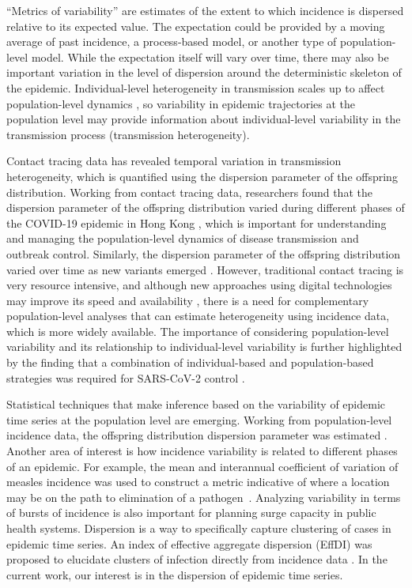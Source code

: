 \documentclass[10pt,letterpaper]{article}
\begin{document}
``Metrics of variability'' are estimates of the extent to which incidence is dispersed relative to its expected value.
The expectation could be provided by a moving average of past incidence, a process-based model, or another type of population-level model. 
While the expectation itself will vary over time, there may also be important variation in the level of dispersion around the deterministic skeleton of the epidemic. 
Individual-level heterogeneity in transmission scales up to affect population-level dynamics \cite{lloyd-smith_superspreading_2005}, so variability in epidemic trajectories at the population level may provide information about individual-level variability in the transmission process (transmission heterogeneity).

Contact tracing data has revealed temporal variation in transmission heterogeneity, which is quantified using the dispersion parameter of the offspring distribution.
Working from contact tracing data, researchers found that the dispersion parameter of the offspring distribution varied during different phases of the COVID-19 epidemic in Hong Kong \cite{guo2023statistical}, which is important for understanding and managing the population-level dynamics of disease transmission and outbreak control.
Similarly, the dispersion parameter of the offspring distribution varied over time as new variants emerged \cite{ko2023time}. 
However, traditional contact tracing is very resource intensive, and although new approaches using digital technologies may improve its speed and availability \cite{kretzschmar_impact_2020}, there is a need for complementary population-level analyses that can estimate heterogeneity using incidence data, which is more widely available. The importance of considering population-level variability and its relationship to individual-level variability is further highlighted by the finding that a combination of individual-based and population-based strategies was required for SARS-CoV-2 control \cite{sun_transmission_2021}. 

Statistical techniques that make inference based on the variability of epidemic time series at the population level are emerging. Working from population-level incidence data, the offspring distribution dispersion parameter was estimated \cite{kirkegaard_superspreading_2021}.
Another area of interest is how incidence variability is related to different phases of an epidemic. For example, the mean and interannual coefficient of variation of measles incidence was used to construct a metric indicative of where a location may be on the path to elimination of a pathogen~\cite{graham_measles_2019}. 
Analyzing variability in terms of bursts of incidence is also important for planning surge capacity in public health systems\cite{wallinga_metropolitan_2018}. 
Dispersion is a way to specifically capture clustering of cases in epidemic time series. An index of effective aggregate dispersion (EffDI) was proposed to elucidate clusters of infection directly from incidence data \cite{schneckenreither_assessing_2023}. In the current work, our interest is in the dispersion of epidemic time series.
\end{document}
